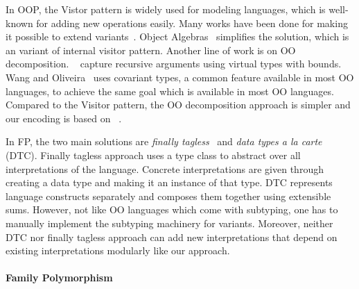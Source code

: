 In OOP, the Vistor pattern is widely used for modeling languages, which is
well-known for adding new operations easily. Many works
have been done for making it possible to extend variants~\cite{oliveira07genericity,oliveira09modular}.
Object Algebras~\cite{bruno12oa} simplifies the solution, which is an variant of
internal visitor pattern.
Another line of work is on OO decomposition. ~\cite{zenger} capture recursive
arguments using virtual types with bounds. Wang and Oliveira~\cite{eptrivially16}
uses covariant types, a common feature available in most OO languages, to achieve the same goal which is available in most OO languages.
Compared to the Visitor pattern, the OO decomposition approach is simpler and our encoding is based on ~\cite{eptrivially16}.

In FP, the two main solutions are \emph{finally
  tagless}~\cite{carette2009finally} and \emph{data types a la
  carte}~\cite{swierstra2008data} (DTC).
Finally tagless approach uses a type class to abstract over all interpretations
of the language. Concrete interpretations are given through creating a data type and
making it an instance of that type.
DTC represents language constructs separately and composes them together using
extensible sums. However, not like OO languages which come with subtyping, one
has to manually implement the subtyping machinery for variants.
Moreover, neither DTC nor finally tagless approach can add new interpretations
that depend on existing interpretations modularly like our approach.

\paragraph{Family Polymorphism}

